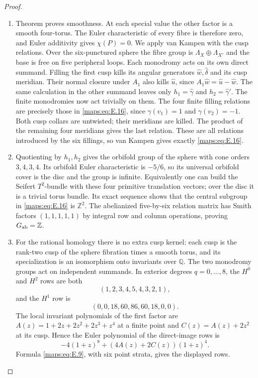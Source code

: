 \begin{proof}
\begin{enumerate}[label={$\langle1\rangle$\arabic*.},leftmargin=*]
\item Theorem  proves smoothness.  At each special value the other
factor is a smooth four-torus.  The Euler characteristic of every
fibre is therefore zero, and Euler additivity gives $\chi(P)=0$.
We apply van Kampen with the cusp relations.
Over the six-punctured sphere the fibre group is
$\Lambda_X\oplus\Lambda_{X'}$ and the base is free on five
peripheral loops.  Each monodromy acts on its own direct summand.
Filling the first cusp kills its angular generators
$\widehat w,\widehat\delta$ and its cusp meridian.  Their normal
closure under $A_1$ also kills $\widehat u$, since
$A_1\widehat w=\widehat u-\widehat w$.  The same calculation
in the other summand leaves only $h_1=\widehat\gamma$ and
$h_2=\widehat\gamma'$.  The finite monodromies now act trivially
on them.  The four finite filling relations are precisely those
in \eqref{maps:eq:E.16}, since $\gamma(v_1)=1$ and $\gamma(v_2)=-1$.
Both cusp collars are untwisted; their meridians are killed.
The product of the remaining four meridians gives the last
relation.  These are all relations introduced by the six
fillings, so van Kampen gives exactly \eqref{maps:eq:E.16}.

\item Quotienting by $h_1,h_2$ gives the orbifold group of the sphere
with cone orders $3,4,3,4$.  Its orbifold Euler characteristic
is $-5/6$, so its universal orbifold cover is the disc and the
group is infinite.  Equivalently one can build the Seifert
$T^2$-bundle with these four primitive translation vectors; over
the disc it is a trivial torus bundle.  Its exact sequence shows
that the central subgroup in \eqref{maps:eq:E.16} is $\mathbb Z^2$.
The abelianized five-by-six relation matrix has Smith factors
$(1,1,1,1,1)$ by integral row and column operations, proving $G_{\rm ab}=\mathbb Z$.

\item For the rational homology there is no extra cusp kernel: each
cusp is the rank-two cusp of the sphere fibration times a smooth torus, and its
specialization is an isomorphism onto invariants over $\mathbb Q$.
The two monodromy groups act on independent summands.  In exterior
degrees $q=0,\ldots,8$, the $H^0$ and $H^2$ rows are both
\[
 (1,2,3,4,5,4,3,2,1),
\]
and the $H^1$ row is
\[
 (0,0,18,60,86,60,18,0,0).
\]
The local invariant polynomials of the first factor are
$A(z)=1+2z+2z^2+2z^3+z^4$ at a finite point and
$C(z)=A(z)+2z^2$ at its cusp.  Hence the Euler polynomial of
the direct-image rows is
\[
 -4(1+z)^8+(4A(z)+2C(z))(1+z)^4.
\]
Formula \eqref{maps:eq:E.9}, with six point strata, gives the displayed rows.


\end{enumerate}
\end{proof}
